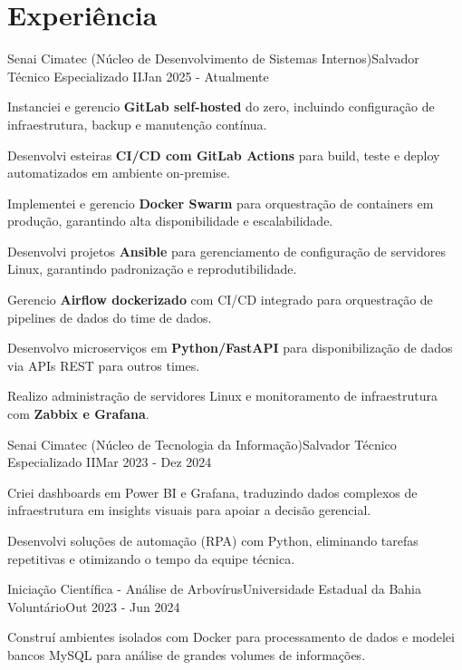 \section{\textbf{Experiência}}
\resumeSubHeadingListStart
\resumeSubheading
{Senai Cimatec (Núcleo de Desenvolvimento de Sistemas Internos)}{Salvador}
{Técnico Especializado II}{Jan 2025 - Atualmente}
\vspace{-2.0mm}
\resumeItemListStart
\item {Instanciei e gerencio \textbf{GitLab self-hosted} do zero, incluindo configuração de infraestrutura, backup e manutenção contínua.}
\item {Desenvolvi esteiras \textbf{CI/CD com GitLab Actions} para build, teste e deploy automatizados em ambiente on-premise.}
\item {Implementei e gerencio \textbf{Docker Swarm} para orquestração de containers em produção, garantindo alta disponibilidade e escalabilidade.}
\item {Desenvolvi projetos \textbf{Ansible} para gerenciamento de configuração de servidores Linux, garantindo padronização e reprodutibilidade.}
\item {Gerencio \textbf{Airflow dockerizado} com CI/CD integrado para orquestração de pipelines de dados do time de dados.}
\item {Desenvolvo microserviços em \textbf{Python/FastAPI} para disponibilização de dados via APIs REST para outros times.}
\item {Realizo administração de servidores Linux e monitoramento de infraestrutura com \textbf{Zabbix e Grafana}.}
\resumeItemListEnd

\resumeSubheading
{Senai Cimatec (Núcleo de Tecnologia da Informação)}{Salvador}
{Técnico Especializado II}{Mar 2023 - Dez 2024}
\vspace{-2.0mm}
\resumeItemListStart
\item {Criei dashboards em Power BI e Grafana, traduzindo dados complexos de infraestrutura em insights visuais para apoiar a decisão gerencial.}
\item {Desenvolvi soluções de automação (RPA) com Python, eliminando tarefas repetitivas e otimizando o tempo da equipe técnica.}
\resumeItemListEnd

\resumeSubheading
{Iniciação Científica - Análise de Arbovírus}{Universidade Estadual da Bahia}
{Voluntário}{Out 2023 - Jun 2024}
\vspace{-2.0mm}
\resumeItemListStart
\item {Construí ambientes isolados com Docker para processamento de dados e modelei bancos MySQL para análise de grandes volumes de informações.}
\resumeItemListEnd

